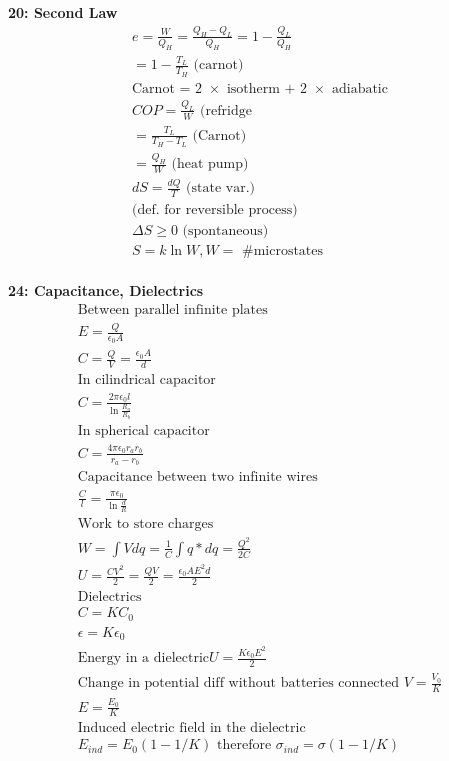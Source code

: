 \documentclass[twoside,draft]{article}
\begin{document}
\begin{multicols}{3}
  \textbf{20: Second Law}
  \begin{align*}
    e = \frac{W}{Q_H} = \frac{Q_H - Q_L}{Q_H} = 1 - \frac{Q_L}{Q_H} \\
    = 1 - \frac{T_L}{T_H} \text{ (carnot)} \\
    \text{Carnot = 2 $\times$ isotherm + 2 $\times$ adiabatic} \\
    COP = \frac{Q_L}{W} \text{ (refridge} \\
    = \frac{T_L}{T_H - T_L} \text{ (Carnot)} \\
    = \frac{Q_H}{W} \text{ (heat pump)} \\
    dS = \frac{dQ}{T} \text{ (state var.)} \\
    \text{(def. for reversible process)} \\
    \Delta S \geq 0 \text{ (spontaneous)} \\
    S = k \ln W, W = \text{ \# microstates} \\
  \end{align*}

  \textbf{24: Capacitance, Dielectrics}
  \begin{align*}
    \text{Between parallel infinite plates}\\
    E = \frac{Q}{\epsilon_{0} A}\\
    C = \frac{Q}{V} = \frac{\epsilon_{0} A}{d}\\
    \text{In cilindrical capacitor}\\
    C = \frac{2\pi \epsilon_{0} l}{\ln{\frac{R_{a}}{R_{b}}}}\\
    \text{In spherical capacitor}\\
    C = \frac{4\pi \epsilon_{0} r_{a} r_{b}}{r_{a} - r_{b}}\\
    \text{Capacitance between two infinite wires}\\
    \frac{C}{l} = \frac{\pi \epsilon_{0}}{\ln{\frac{d}{R}}}\\
    \text{Work to store charges}\\
    W = \int{V dq} = \frac{1}{C}\int{q*dq} = \frac{Q^2}{2C}\\
    U = \frac{CV^2}{2} = \frac{QV}{2} = \frac{\epsilon_{0}AE^2d}{2}\\
    \text{Dielectrics}\\
    C = KC_{0}\\
    \epsilon = K\epsilon_{0}\\
    \text{Energy in a dielectric} U = \frac{K\epsilon_{0}E^2}{2}\\
    \text{Change in potential diff without batteries connected } V = \frac{V_{0}}{K}\\
    E = \frac{E_{0}}{K}\\
    \text{Induced electric field in the dielectric}\\
    E_{ind} = E_{0}(1-1/K)\text{ therefore } \sigma_{ind} = \sigma(1-1/K)\\
  \end{align*}

\end{multicols}
\end{document}

